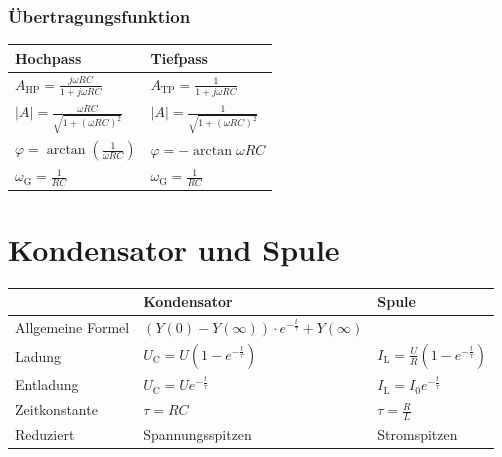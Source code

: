 		\subsubsection{Übertragungsfunktion}
			\begin{table}[h]
			\begin{tabular}{ll}
				Hochpass & Tiefpass\\
				\toprule
				$A_{\mathrm{HP}}=\frac{j\omega RC}{1+j\omega RC}$ & $A_{\mathrm{TP}}=\frac{1}{1+j\omega RC}$\\
				\midrule
				$\left|A\right|=\frac{\omega RC}{\sqrt{1+(\omega RC)^2}}$ & $\left|A\right|=\frac{1}{\sqrt{1+(\omega RC)^2}}$\\
				\midrule
				$\varphi=\arctan\left(\frac{1}{\omega RC}\right)$ & $\varphi=-\arctan\omega RC$\\
				\midrule
				$\omega_{\mathrm{G}}=\frac{1}{RC}$ & $\omega_{\mathrm{G}}=\frac{1}{RC}$\\
			\end{tabular}
			\end{table}
	\clearpage

	\section{Kondensator und Spule}
		\begin{table}[here]
		\begin{tabular}{lll}
		& Kondensator & Spule\\
		\toprule
		Allgemeine Formel & $(Y(0)-Y(\infty))\cdot e^{-\frac{t}{\tau}}+Y(\infty)$ & \\
		\midrule
		Ladung & $U_{\mathrm{C}}=U\left(1-e^{-\frac{t}{\tau}}\right)$ & $I_{\mathrm{L}}=\frac{U}{R}\left(1-e^{-\frac{t}{\tau}}\right)$\\
		\midrule
		Entladung & $U_{\mathrm{C}}=Ue^{-\frac{t}{\tau}}$ & $I_{\mathrm{L}}=I_0e^{-\frac{t}{\tau}}$\\
		\midrule
		Zeitkonstante & $\tau=RC$ & $\tau=\frac{R}{L}$\\
		\midrule
		Reduziert & Spannungsspitzen & Stromspitzen\\
		\end{tabular}
		\end{table}	
